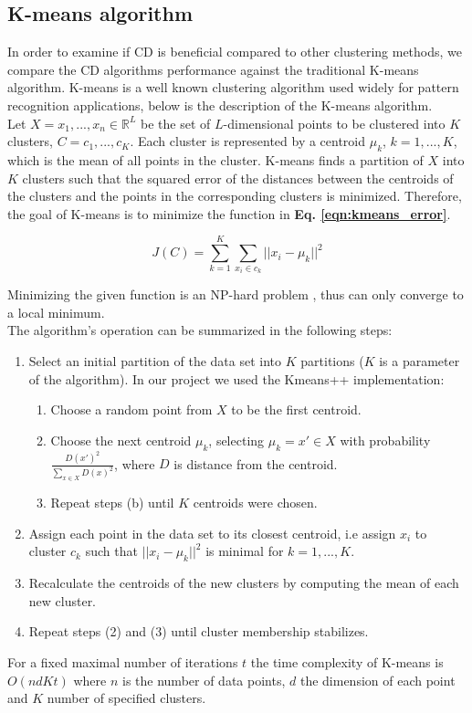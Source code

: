 \subsection{K-means algorithm}
In order to examine if \acrshort{CD} is beneficial compared to other clustering methods, we compare the \acrshort{CD} algorithms performance against the traditional K-means algorithm.
K-means is a well known clustering algorithm used widely for pattern recognition applications, below is the description of the K-means algorithm\cite{10.5555/46712}.\\
Let $X=x_1,...,x_n \in \mathbb{R}^L$ be the set of $L$-dimensional points to be clustered into $K$ clusters, $C=c_1,...,c_K$. Each cluster is represented by a centroid $\mu_k$, $k=1,...,K$, which is the mean of all points in the cluster. K-means finds a partition of $X$ into $K$ clusters such that the squared error of the distances between the centroids of the clusters and the points in the corresponding clusters is minimized. Therefore, the goal of K-means is to minimize the function in \textbf{Eq. \ref{eqn:kmeans_error}}.

\begin{equation}
\label{eqn:kmeans_error}
J(C)=\sum_{k=1}^K{\sum_{x_i \in c_k}{||x_i-\mu_k||^2}}
\end{equation} 

Minimizing the given function is an \textsc{NP}-hard problem \cite{Drineas_1999}, thus can only converge to a local minimum.\\
The algorithm's operation can be summarized in the following steps:
\begin{enumerate}
\item Select an initial partition of the data set into $K$ partitions ($K$ is a parameter of the algorithm). In our project we used the Kmeans++ implementation\cite{10.5555/1283383.1283494}:
	\begin{enumerate}
	\item Choose a random point from $X$ to be the first centroid.
	\item Choose the next centroid $\mu_k$, selecting $\mu_k=x' \in X$ with probability $\frac{D(x')^2}{\sum_{x \in X}{D(x)^2}}$, where $D$ is distance from the centroid.
	\item Repeat steps (b) until $K$ centroids were chosen.
	\end{enumerate}
\item Assign each point in the data set to its closest centroid, i.e assign $x_i$ to cluster $c_k$ such that $||x_i-\mu_k||^2$ is minimal for $k=1,...,K$.
\item Recalculate the centroids of the new clusters by computing the mean of each new cluster.
\item Repeat steps (2) and (3) until cluster membership stabilizes.
\end{enumerate}
For a fixed maximal number of iterations $t$ the time complexity of K-means is $O(ndKt)$ where $n$ is the number of data points, $d$ the dimension of each point and $K$ number of specified clusters.

\clearpage